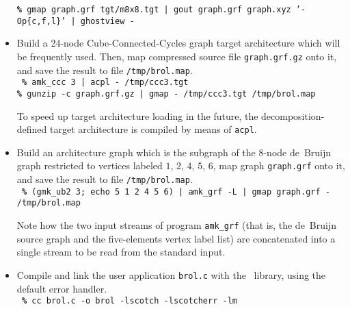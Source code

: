 \begin{itemize}
\noi
{\tt {\bf\%} gmap graph.grf tgt/m8x8.tgt | gout graph.grf graph.xyz '-Op\{c,f,l\}' | ghostview -}
\item
Build a 24-node Cube-Connected-Cycles graph target architecture which will be
frequently used. Then, map compressed source file {\tt graph.grf.gz} onto it,
and save the result to file {\tt /tmp/brol.map}.
\\

\noi
{\tt
{\bf\%} amk\_ccc 3 | acpl - /tmp/ccc3.tgt\\
{\bf\%} gunzip -c graph.grf.gz | gmap - /tmp/ccc3.tgt /tmp/brol.map
}
\spa

\noi
To speed up target architecture loading in the future, the
decomposition-defined target architecture is compiled by means of {\tt acpl}.
\item
Build an architecture graph which is the subgraph of the $8$-node de~Bruijn
graph restricted to vertices labeled $1$, $2$, $4$, $5$, $6$, map graph
{\tt graph.grf} onto it, and save the result to file {\tt /tmp/brol.map}.
\\

\noi
{\tt
{\bf\%} (gmk\_ub2 3; echo 5 1 2 4 5 6) | amk\_grf -L |
gmap graph.grf - /tmp/brol.map}
\spa

\noi
Note how the two input streams of program {\tt amk\_grf} (that is, the
de~Bruijn source graph and the five-elements vertex label list) are
concatenated into a single stream to be read from the standard input.


\item
Compile and link the user application {\tt brol.c} with the \libscotch\ library,
using the default error handler.
\\

\noi
{\tt
{\bf\%} cc brol.c -o brol -lscotch -lscotcherr -lm}
\spa


\end{itemize}
